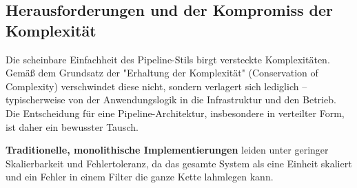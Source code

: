 \documentclass[10pt,a4paper]{article}
\begin{document}
\subsection{Herausforderungen und der Kompromiss der Komplexität}
Die scheinbare Einfachheit des Pipeline-Stils birgt versteckte Komplexitäten. Gemäß dem Grundsatz der "Erhaltung der Komplexität" (Conservation of Complexity) verschwindet diese nicht, sondern verlagert sich lediglich – typischerweise von der Anwendungslogik in die Infrastruktur und den Betrieb. Die Entscheidung für eine Pipeline-Architektur, insbesondere in verteilter Form, ist daher ein bewusster Tausch.

\textbf{Traditionelle, monolithische Implementierungen} leiden unter geringer Skalierbarkeit und Fehlertoleranz, da das gesamte System als eine Einheit skaliert und ein Fehler in einem Filter die ganze Kette lahmlegen kann.\cite{richards2020}
\end{document}
